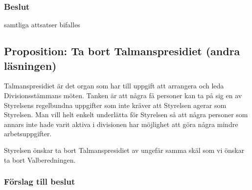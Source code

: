 \documentclass[protokoll]{dvd}
\begin{document}
\subsubsection*{Beslut}
    \begin{attsatser}
        \item samtliga attsatser bifalles
    \end{attsatser}

\newpage
\subsection{Proposition: Ta bort Talmanspresidiet (andra läsningen)}

Talmanspresidiet är det organ som har till uppgift att arrangera och leda Divisionsstämmans möten.
Tanken är att några få personer kan ta på sig en av Styrelsens regelbundna uppgifter som inte kräver att Styrelsen agerar som Styrelsen.
Man vill helt enkelt underlätta för Styrelsen så att några personer som annars inte hade varit aktiva i divisionen har möjlighet att göra några mindre arbetsuppgifter.

Styrelsen önskar ta bort Talmanspresidiet av ungefär samma skäl som vi önskar ta bort Valberedningen.

\subsubsection*{Förslag till beslut}
\end{document}
